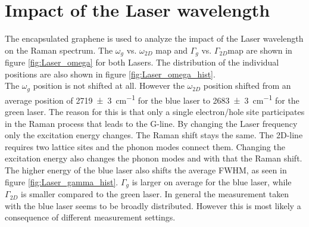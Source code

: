 \documentclass[12pt,a4paper]{article}
\begin{document}
\section{Impact of the Laser wavelength}
The encapsulated graphene is used to analyze the impact of the Laser wavelength on the Raman spectrum. The $\omega_g$ vs. $\omega_{2D}$ map and $\Gamma_g$ vs. $\Gamma_{2D}$map are shown in figure \ref{fig:Laser_omega} for both Lasers. The distribution of the individual positions are also shown in figure \ref{fig:Laser_omega_hist}.\\
The $\omega_g$ position is not shifted at all. However the $\omega_{2D}$ position shifted from an average position of \SI{2719(3)}{cm^{-1}} for the blue laser to \SI{2683(3)}{cm^{-1}} for the green laser. The reason for this is that only a single electron/hole site participates in the Raman process that leads to the G-line. By changing the Laser frequency only the excitation energy changes. The Raman shift stays the same. The 2D-line requires two lattice sites and the phonon modes connect them. Changing the excitation energy also changes the phonon modes and with that the Raman shift.\\
The higher energy of the blue laser also shifts the average FWHM, as seen in figure \ref{fig:Laser_gamma_hist}. $\Gamma_g$ is larger on average for the blue laser, while $\Gamma_{2D}$ is smaller compared to the green laser. In general the measurement taken with the blue laser seems to be broadly distributed. However this is most likely a consequence of different measurement settings.\\
\\
\end{document}

